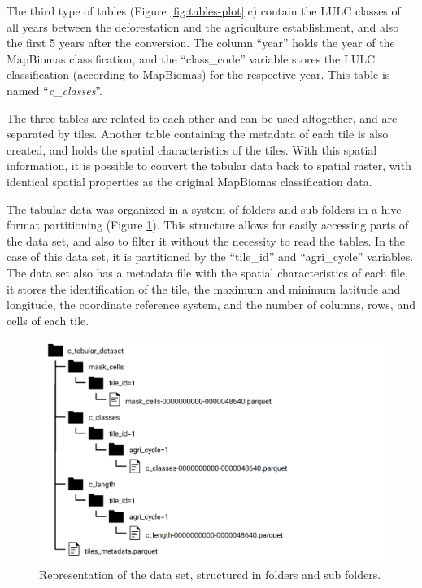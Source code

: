 \documentclass[essd, manuscript]{copernicus}
\begin{document}
The third type of tables (Figure \ref{fig:tables-plot}.c) contain the LULC classes of all years between the deforestation and the agriculture establishment, and also the first 5 years after the conversion.
The column ``year'' holds the year of the MapBiomas classification, and the ``class\_code'' variable stores the LULC classification (according to MapBiomas) for the respective year.
This table is named ``\emph{c\_classes}''.

The three tables are related to each other and can be used altogether, and are separated by tiles.
Another table containing the metadata of each tile is also created, and holds the spatial characteristics of the tiles.
With this spatial information, it is possible to convert the tabular data back to spatial raster, with identical spatial properties as the original MapBiomas classification data.

The tabular data was organized in a system of folders and sub folders in a hive format partitioning (Figure \ref{fig:dataset-plot}).
This structure allows for easily accessing parts of the data set, and also to filter it without the necessity to read the tables.
In the case of this data set, it is partitioned by the ``tile\_id'' and ``agri\_cycle'' variables.
The data set also has a metadata file with the spatial characteristics of each file, it stores the identification of the tile, the maximum and minimum latitude and longitude, the coordinate reference system, and the number of columns, rows, and cells of each tile.

\begin{figure}[h]
\includegraphics[width=17cm]{figs/dataset_structure} \caption{ Representation of the data set, structured in folders and sub folders.}\label{fig:dataset-plot}
\end{figure}
\end{document}
